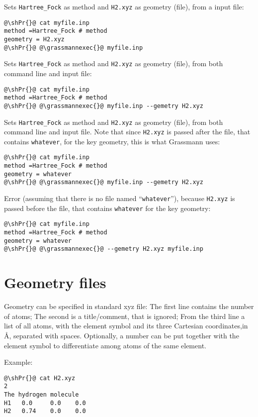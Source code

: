 Sets \verb+Hartree_Fock+ as method and \verb+H2.xyz+ as geometry (file), from a input file:
\begin{lstlisting}[style=shstyint]
@\shPr{}@ cat myfile.inp
method =Hartree_Fock # method
geometry = H2.xyz
@\shPr{}@ @\grassmannexec{}@ myfile.inp
\end{lstlisting}

Sets \verb+Hartree_Fock+ as method and \verb+H2.xyz+ as geometry (file), from both command line and input file:
\begin{lstlisting}[style=shstyint]
@\shPr{}@ cat myfile.inp
method =Hartree_Fock # method
@\shPr{}@ @\grassmannexec{}@ myfile.inp --gemetry H2.xyz
\end{lstlisting}

Sets \verb+Hartree_Fock+ as method and \verb+H2.xyz+ as geometry (file),
from both command line and input file.
Note that since \verb+H2.xyz+ is passed after the file, that contains \verb+whatever+,
for the key geometry, this is what Grassmann uses:
\begin{lstlisting}[style=shstyint]
@\shPr{}@ cat myfile.inp
method =Hartree_Fock # method
geometry = whatever
@\shPr{}@ @\grassmannexec{}@ myfile.inp --gemetry H2.xyz
\end{lstlisting}

Error (assuming that there is no file named ``\verb+whatever+''),
because \verb+H2.xyz+ is passed before the file, that contains \verb+whatever+ for the key geometry:
\begin{lstlisting}[style=shstyint]
@\shPr{}@ cat myfile.inp
method =Hartree_Fock # method
geometry = whatever
@\shPr{}@ @\grassmannexec{}@ --gemetry H2.xyz myfile.inp
\end{lstlisting}


\section{Geometry files}
\label{sec:geometry}
Geometry can be specified in standard xyz file:
The first line contains the number of atoms;
The second is a title/comment, that is ignored;
From the third line a list of all atoms,
with the element symbol and its three Cartesian coordinates,in \AA, separated with spaces.
Optionally, a number can be put together with the element symbol to differentiate
among atoms of the same element.

Example:
\begin{lstlisting}[style=shstyint]
@\shPr{}@ cat H2.xyz
2
The hydrogen molecule
H1   0.0     0.0    0.0
H2   0.74    0.0    0.0
\end{lstlisting}


